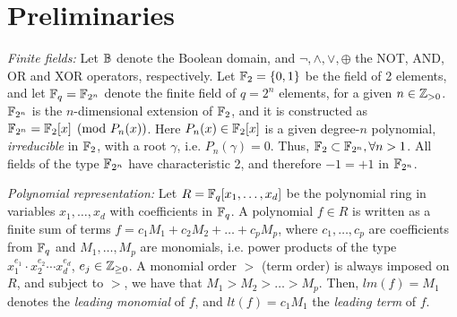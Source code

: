 \section{Preliminaries}
\label{sec:prelim}
{\it Finite fields:} Let ${\mathbb{B}}$ denote the Boolean domain, and $\neg,
\wedge,\vee, \oplus$ the NOT, AND, OR and XOR operators,
respectively. Let ${\mathbb{F}}_2=\{0,1\}$ be the field of 2 elements, and let
${\mathbb{F}}_q = {\mathbb{F}}_{2^n}$ denote the finite field of $q=2^n$ elements, for a
given $n\in {\mathbb{Z}}_{> 0}$. ${\mathbb{F}}_{2^n}$ is the $n$-dimensional extension of
${\mathbb{F}}_2$, and it is constructed as ${\mathbb{F}}_{2^n} = {\mathbb{F}}_2[x]\pmod{ P_n(x)}$. Here
$P_n(x) \in {\mathbb{F}}_2[x]$ is a given degree-$n$ polynomial, {\it
  irreducible} in ${\mathbb{F}}_2$, with a root $\gamma$, i.e.  $P_n(\gamma)=0$.  
Thus, ${\mathbb{F}}_2 \subset {\mathbb{F}}_{2^n}, \forall n>1$. All fields of the type
${\mathbb{F}}_{2^n}$ have characteristic 2, and therefore $-1 = +1$ in ${\mathbb{F}}_{2^n}$. 


{\it Polynomial representation:} Let $R={\mathbb{F}}_q[x_1,\dots,x_d]$ be the
polynomial ring in variables $x_1,\dots,x_d$ with coefficients in
${\mathbb{F}}_q$. A polynomial $f \in R$ is 
written as a finite sum of terms  $f = c_1 M_1 +  c_2 M_2 + \dots +
c_p M_p$, where $c_1, \dots, c_p$ are coefficients from ${\mathbb{F}}_q$ and
$M_1, \dots, M_p$ are monomials, i.e. power products of the type
$x_1^{e_{1}}\cdot x_2^{e_{2}}\cdots x_d^{e_{d}}$,  $e_j \in {\mathbb{Z}}_{\geq  0}$. 
A monomial order $>$ (term order) is always imposed on $R$, and
subject to $>$, we have that $M_1 >M_2 > \dots > M_p$. Then, $lm(f) =
M_1$ denotes the {\it leading monomial} of $f$, and $lt(f) = c_1 M_1$
the  {\it leading   term} of $f$. 

